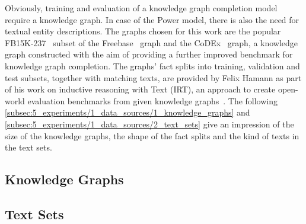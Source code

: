 Obviously, training and evaluation of a knowledge graph completion model require a knowledge graph. In case of the Power model, there is also the need for textual entity descriptions. The graphs chosen for this work are the popular FB15K-237~\cite{Toutanova2015ObservedVL} subset of the  Freebase~\cite{Bollacker2008FreebaseAC} graph and the CoDEx~\cite{Safavi2020CoDExAC} graph, a knowledge graph constructed with the aim of providing a further improved benchmark for knowledge graph completion. The graphs' fact splits into training, validation and test subsets, together with matching texts, are provided by Felix Hamann as part of his work on inductive reasoning with Text (IRT), an approach to create open-world evaluation benchmarks from given knowledge graphs~\cite{}. The following \autoref{subsec:5_experiments/1_data_sources/1_knowledge_graphs} and \autoref{subsec:5_experiments/1_data_sources/2_text_sets} give an impression of the size of the knowledge graphs, the shape of the fact splits and the kind of texts in the text sets.

\subsection{Knowledge Graphs}
\label{subsec:5_experiments/1_data_sources/1_knowledge_graphs}


\subsection{Text Sets}
\label{subsec:5_experiments/1_data_sources/2_text_sets}

